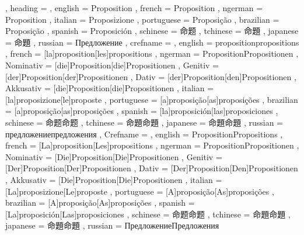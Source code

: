   {
    , heading =   {
                    , english     = Proposition
                    , french      = Proposition
                    , ngerman     = Proposition
                    , italian     = Proposizione
                    , portuguese  = Proposição
                    , brazilian   = Proposição
                    , spanish     = Proposición
                    , schinese    = 命题
                    , tchinese    = 命題
                    , japanese    = 命題
                    , russian     = Предложение
                  }
    , crefname =  {
                    , english     = {proposition}{propositions}
                    , french      = [la]{proposition}[les]{propositions}
                    , ngerman     = { {Proposition}{Propositionen}
                                      , Nominativ = [die]{Proposition}[die]{Propositionen}
                                      , Genitiv   = [der]{Proposition}[der]{Propositionen}
                                      , Dativ     = [der]{Proposition}[den]{Propositionen}
                                      , Akkusativ = [die]{Proposition}[die]{Propositionen}
                                    }
                    , italian     = [la]{proposizione}[le]{proposte}
                    , portuguese  = [a]{proposição}[as]{proposições}
                    , brazilian   = [a]{proposição}[as]{proposições}
                    , spanish     = [la]{proposición}[las]{proposiciones}
                    , schinese    = {命题}{命题}
                    , tchinese    = {命題}{命題}
                    , japanese    = {命題}{命題}
                    , russian     = {предложение}{предложения}
                  }
    , Crefname =  {
                    , english     = {Proposition}{Propositions}
                    , french      = [La]{proposition}[Les]{propositions}
                    , ngerman     = { {Proposition}{Propositionen}
                                      , Nominativ = [Die]{Proposition}[Die]{Propositionen}
                                      , Genitiv   = [Der]{Proposition}[Der]{Propositionen}
                                      , Dativ     = [Der]{Proposition}[Den]{Propositionen}
                                      , Akkusativ = [Die]{Proposition}[Die]{Propositionen}
                                    }
                    , italian     = [La]{proposizione}[Le]{proposte}
                    , portuguese  = [A]{proposição}[As]{proposições}
                    , brazilian   = [A]{proposição}[As]{proposições}
                    , spanish     = [La]{proposición}[Las]{proposiciones}
                    , schinese    = {命题}{命题}
                    , tchinese    = {命題}{命題}
                    , japanese    = {命題}{命題}
                    , russian     = {Предложение}{Предложения}
                  }
  }

